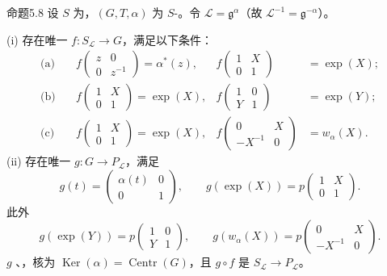 \begin{SGAresult}{命题}{5.8}
设 $S$ 为，$(G,T,\alpha)$ 为 $S$-。令 $\mathscr L=\mathfrak g^\alpha$（故 $\mathscr L^{-1}=\mathfrak g^{-\alpha}$）。

(i) 存在唯一 $f:S_{\mathscr L}\to G$，满足以下条件：
\[\begin{aligned}\text{(a)}\quad&f\begin{pmatrix}z&0\\0&z^{-1}\end{pmatrix}=\alpha^*(z),&f\begin{pmatrix}1&X\\0&1\end{pmatrix}&=\exp(X);\\\text{(b)}\quad&f\begin{pmatrix}1&X\\0&1\end{pmatrix}=\exp(X),&f\begin{pmatrix}1&0\\Y&1\end{pmatrix}&=\exp(Y);\\\text{(c)}\quad&f\begin{pmatrix}1&X\\0&1\end{pmatrix}=\exp(X),&f\begin{pmatrix}0&X\\-X^{-1}&0\end{pmatrix}&=w_\alpha(X).\end{aligned}\]
(ii) 存在唯一 $g:G\to P_{\mathscr L}$，满足
\[g(t)=\begin{pmatrix}\alpha(t)&0\\0&1\end{pmatrix},\qquad g(\exp(X))=p\begin{pmatrix}1&X\\0&1\end{pmatrix}.\]
此外
\[g(\exp(Y))=p\begin{pmatrix}1&0\\Y&1\end{pmatrix},\qquad g(w_\alpha(X))=p\begin{pmatrix}0&X\\-X^{-1}&0\end{pmatrix}.\]
$g$ 、，核为 $\operatorname{Ker}(\alpha)=\operatorname{Centr}(G)$，且 $g\circ f$ 是 $S_{\mathscr L}\to P_{\mathscr L}$。
\end{SGAresult}
